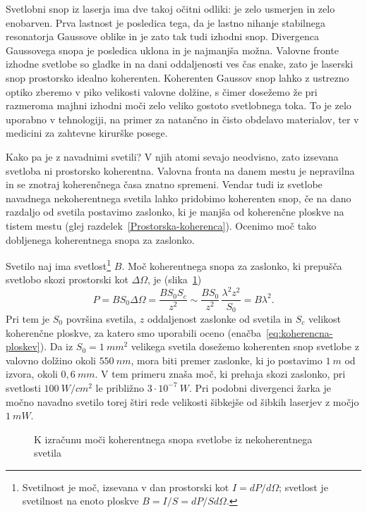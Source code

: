 Svetlobni snop iz laserja ima dve takoj očitni odliki: je zelo
usmerjen in zelo enobarven. Prva lastnost je posledica tega, da je
lastno nihanje stabilnega resonatorja Gaussove oblike in je zato tak tudi
izhodni snop. Divergenca Gaussovega snopa je posledica uklona in je 
najmanjša možna. Valovne fronte izhodne svetlobe so gladke in na dani oddaljenosti ves 
čas enake, zato je laserski snop prostorsko idealno koherenten. 
Koherenten Gaussov snop lahko z ustrezno optiko zberemo v piko velikosti
valovne dolžine, s čimer dosežemo že pri razmeroma majhni izhodni moči zelo veliko
gostoto svetlobnega toka. To je zelo uporabno v tehnologiji, na primer za natančno in
čisto obdelavo materialov, ter v medicini za
zahtevne kirurške posege.

Kako pa je z navadnimi svetili? V njih atomi sevajo neodvisno, zato
izsevana svetloba ni prostorsko koherentna. Valovna fronta na danem 
mestu je nepravilna in se znotraj koherenčnega časa znatno spremeni. 
Vendar tudi iz svetlobe navadnega nekoherentnega svetila lahko pridobimo
koherenten snop, če na dano razdaljo od svetila postavimo zaslonko, ki
je manjša od koherenčne ploskve na tistem mestu (glej 
razdelek~\ref{Prostorska-koherenca}). Ocenimo moč tako dobljenega
koherentnega snopa za zaslonko.

Svetilo naj ima svetlost\footnote{Svetilnost je moč, izsevana v dan 
prostorski kot $I = dP/d\Omega$; svetlost je svetilnost na enoto ploskve
$B=I/S = dP/Sd\Omega$.} $B$.  
Moč koherentnega snopa za zaslonko, ki prepušča svetlobo skozi prostorski kot 
$\Delta\Omega$, je (slika~\ref{fig:svetlost})
\begin{equation}
P=BS_{0}\Delta \Omega =\frac{BS_{0}S_{c}}{z^{2}}\sim \frac{BS_{0}}{z^{2}}\,
\frac{\lambda ^{2}z^{2}}{S_{0}}=B\lambda ^{2}.
\label{5.21}
\end{equation}
Pri tem je $S_{0}$ površina svetila, $z$ oddaljenost zaslonke od svetila in
$S_{c}$ velikost koherenčne ploskve, za katero smo uporabili oceno 
(enačba~\ref{eq:koherencna-ploskev}). Da iz $S_0=1~\si{mm}^2$ velikega svetila 
dosežemo koherenten snop svetlobe z valovno dolžino okoli $550~\si{nm}$, 
mora biti premer zaslonke, ki jo postavimo $1~\si{m}$ od izvora, 
okoli $0,6~\si{mm}$. V tem primeru znaša 
moč, ki prehaja skozi zaslonko, pri svetlosti $100~\si{W/cm^{2}}$ 
le približno $3\cdot10^{-7}~\si{W}$.
Pri podobni divergenci žarka je močno navadno svetilo torej štiri rede
velikosti šibkejše od šibkih laserjev z močjo $1~\si{mW}$. 
\begin{figure}[h]
\centering
\def\svgwidth{100truemm} 

\caption{K izračunu moči koherentnega snopa svetlobe iz nekoherentnega svetila}
\label{fig:svetlost}
\end{figure}


